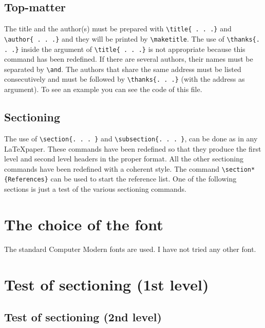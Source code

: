 \documentclass[a4paper,twocolumn,10pt]{article} %
\begin{document}
\subsection{Top-matter}
The title and the author(s) must be prepared with 
\verb+\title{ . . .}+  and \verb+\author{ . . .}+ and they will be 
printed by \verb+\maketitle+.  The use of \verb+\thanks{. . .}+ inside 
the argument of \verb+\title{ . . .}+ is not appropriate because this 
command has been redefined.
If there are several authors, their 
names must be separated by \verb+\and+. The authors that share the 
same address must be listed consecutively and must be followed by 
\verb+\thanks{. . .}+ (with the address as argument). To see an example 
you can see the code of this file. 
\subsection{Sectioning}
The use of \verb+\section{. . . }+  and \verb+\subsection{. . . }+,
can be done as in any \LaTeX paper. 
These commands have been redefined so that they 
produce the first level and second level headers in the proper format. 
All the other sectioning commands have been redefined with a coherent 
style. 
The command \verb+\section*{References}+ can be used to start  
the reference list. One of the following sections is just a test of 
the various sectioning commands.
\section{The choice of the font}
The standard Computer Modern fonts are used. 
I have not tried any  other font.
\section{Test of sectioning (1st level)} 
\subsection{Test of sectioning (2nd level)} 
\end{document}
